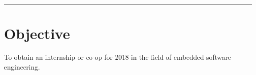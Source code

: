 \documentclass[resmargin]{res}
\begin{document}

\address{Pella, IA\\ \href{http://www.linkedin.com/in/stuartmillerdev/}{linkedin.com/in/stuartmillerdev}}
\address{816-785-4105\\stewythe1st@gmail.com}

\begin{resume}

\hspace{-1.26in}\noindent\rule{7.0in}{0.4pt}

\section{Objective}
To obtain an internship or co-op for 2018 in the field of embedded software engineering.


\end{resume}
\end{document}
